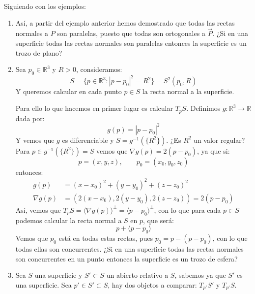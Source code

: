 \begin{ejercicio}
    Siguiendo con los ejemplos:
    \begin{enumerate}
        \item[1a.] Así, a partir del ejemplo anterior hemos demostrado que todas las rectas normales a $P$ son paralelas, puesto que todas son ortogonales a $\vec{P}$. ¿Si en una superficie todas las rectas normales son paralelas entonces la superficie es un trozo de plano?
        \item[1b.] Sea $p_0\in \mathbb{R}^3$ y $R>0$, consideramos:
            \begin{equation*}
                S = \{p\in \mathbb{R}^3 : |p-p_0|^2 = R^2\} = S^2(p_0,R)
            \end{equation*}
            Y queremos calcular en cada punto $p\in S$ la recta normal a la superficie.

            Para ello lo que hacemos en primer lugar es calcular $T_pS$. Definimos $g:\mathbb{R}^3\to\mathbb{R}$ dada por:
            \begin{equation*}
                g(p) = |p-p_0|^2
            \end{equation*}
            Y vemos que $g$ es diferenciable y $S = g^{-1}(\{R^2\})$. ¿Es $R^2$ un valor regular? Para $p\in g^{-1}(\{R^2\}) = S$ vemos que $\nabla g(p) = 2(p-p_0)$, ya que si:
            \begin{equation*}
                p = (x,y,z), \qquad p_0=(x_0,y_0,z_0)
            \end{equation*}
            entonces:
            \begin{align*}
                g(p) &= {(x-x_0)}^{2} + {(y-y_0)}^{2} + {(z-z_0)}^{2} \\
                \nabla g(p) &= (2(x-x_0), 2(y-y_0), 2(z-z_0)) = 2(p-p_0)
            \end{align*}
            Así, vemos que $T_pS = \langle \nabla g(p) \rangle^\perp = \langle p-p_0 \rangle^\perp$, con lo que para cada $p\in S$ podemos calcular la recta normal a $S$ en $p$, que será:
            \begin{equation*}
                p + \langle p-p_0 \rangle 
            \end{equation*}
            Vemos que $p_0$ está en todas estas rectas, pues $p_0 = p - (p-p_0)$, con lo que todas ellas son concurrentes. ¿Si en una superficie todas las rectas normales son concurrentes en un punto entonces la superficie es un trozo de esfera?
        \item[2.] Sea $S$ una superficie y $S'\subset S$ un abierto relativo a $S$, sabemos ya que $S'$ es una superficie. Sea $p'\in S'\subset S$, hay dos objetos a comparar: $T_{p'}S'$ y $T_{p'}S$. 


\end{enumerate}
\end{ejercicio}
